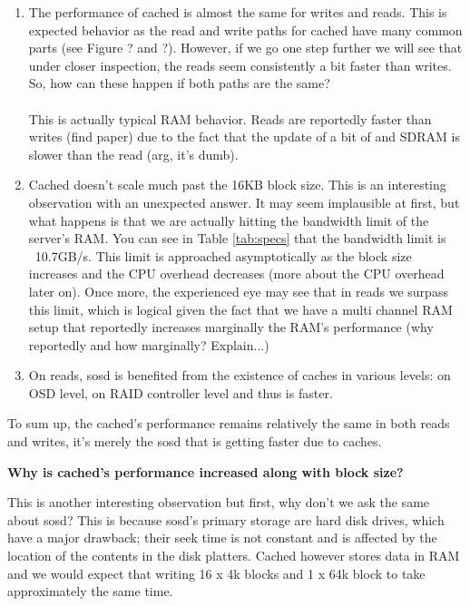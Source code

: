 \begin{enumerate}
	\item The performance of cached is almost the same for writes and 
		reads.  This is expected behavior as the read and write paths 
		for cached have many common parts (see Figure ? and ?).  
		However, if we go one step further we will see that under 
		closer inspection, the reads seem consistently a bit faster 
		than writes. So, how can these happen if both paths are the 
		same? \\
		\\
		This is actually typical RAM behavior. Reads are reportedly 
		faster than writes (find paper) due to the fact that the update 
		of a bit of and SDRAM is slower than the read (arg, it's dumb).
	\item Cached doesn't scale much past the 16KB block size. This is an 
		interesting observation with an unexpected answer. It may seem 
		implausible at first, but what happens is that we are actually 
		hitting the bandwidth limit of the server's RAM. You can see in 
		Table \ref{tab:specs} that the bandwidth limit is ~10.7GB/s. 
		This limit is approached asymptotically as the block size 
		increases and the CPU overhead decreases (more about the CPU 
		overhead later on). Once more, the experienced eye may see that 
		in reads we surpass this limit, which is logical given the fact 
		that we have a multi channel RAM setup that reportedly 
		increases marginally the RAM's performance (why reportedly and 
		how marginally? Explain...)
	\item On reads, sosd is benefited from the existence of caches in 
		various levels: on OSD level, on RAID controller level and thus 
		is faster.
\end{enumerate}

To sum up, the cached's performance remains relatively the same in both reads 
and writes, it's merely the sosd that is getting faster due to caches. 

\textbf{Why is cached's performance increased along with block size?}

This is another interesting observation but first, why don't we ask the same 
about sosd? This is because sosd's primary storage are hard disk drives, which 
have a major drawback; their seek time is not constant and is affected by the 
location of the contents in the disk platters. Cached however stores data in 
RAM and we would expect that writing 16 x 4k blocks and 1 x 64k block to take 
approximately the same time.

